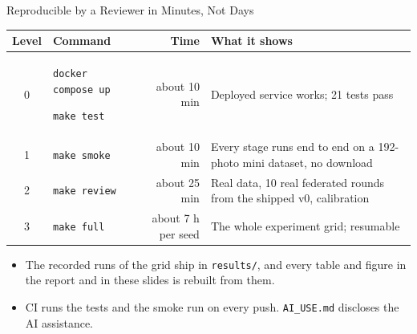 \documentclass[11pt, aspectratio=169]{beamer}
\begin{document}
\begin{frame}[t]{Reproducible by a Reviewer in Minutes, Not Days}
  \body
  \renewcommand{\arraystretch}{1.1}
  \begin{tabular}{@{}cL{0.27\textwidth}rL{0.45\textwidth}@{}}
    \toprule
    \textbf{Level} & \textbf{Command} & \textbf{Time} & \textbf{What it shows} \\
     & \texttt{docker compose up}\par\texttt{make test} & about 10 min & Deployed service works; 21 tests pass \\
    1 & \texttt{make smoke} & about 10 min & Every stage runs end to end on a 192-photo mini dataset, no download \\
    2 & \texttt{make review} & about 25 min & Real data, 10 real federated rounds from the shipped v0, calibration \\
    3 & \texttt{make full} & about 7 h per seed & The whole experiment grid; resumable \\
    \bottomrule
  \end{tabular}\par\vspace{0.6em}
  \begin{itemize}\setlength\itemsep{0.2em}
    \item The recorded runs of the grid ship in \texttt{results/}, and every table and figure in the report and in these slides is rebuilt from them.
    \item CI runs the tests and the smoke run on every push. \texttt{AI\_USE.md} discloses the AI assistance.
  \end{itemize}
\end{frame}

\end{document}
